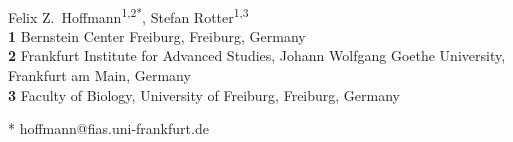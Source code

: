 \begin{flushleft}
{\Large
\textbf{} %
}
\newline
\\
Felix Z.~Hoffmann\textsuperscript{1,2*},
Stefan Rotter\textsuperscript{1,3}
\\
\bigskip
\textbf{1} Bernstein Center Freiburg, Freiburg, Germany
\\
\textbf{2} Frankfurt Institute for Advanced Studies, Johann Wolfgang Goethe University, Frankfurt am Main, Germany
\\
\textbf{3} Faculty of Biology, University of Freiburg, Freiburg,
Germany
\medskip

% 

* hoffmann@fias.uni-frankfurt.de

\end{flushleft}
